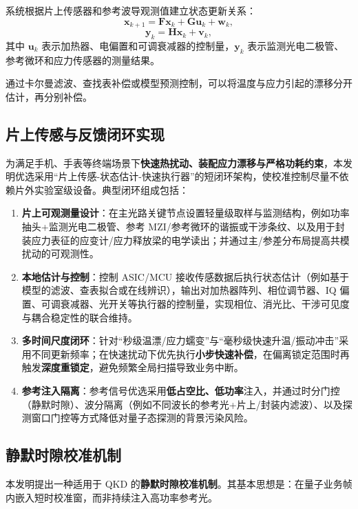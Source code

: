 \documentclass[12pt,a4paper]{article}
\begin{document}
系统根据片上传感器和参考波导观测值建立状态更新关系：
\[
\mathbf{x}_{k+1} = \mathbf{F}\mathbf{x}_k + \mathbf{G}\mathbf{u}_k + \mathbf{w}_k,
\]
\[
\mathbf{y}_k = \mathbf{H}\mathbf{x}_k + \mathbf{v}_k,
\]
其中 $\mathbf{u}_k$ 表示加热器、电偏置和可调衰减器的控制量，$\mathbf{y}_k$ 表示监测光电二极管、参考微环和应力传感器的测量结果。

通过卡尔曼滤波、查找表补偿或模型预测控制，可以将温度与应力引起的漂移分开估计，再分别补偿。

\subsection{片上传感与反馈闭环实现}

为满足手机、手表等终端场景下\textbf{快速热扰动、装配应力漂移与严格功耗约束}，本发明优选采用“片上传感-状态估计-快速执行器”的短闭环架构，使校准控制尽量不依赖片外实验室级设备。典型闭环组成包括：
\begin{enumerate}[label=(\arabic*)]
    \item \textbf{片上可观测量设计}：在主光路关键节点设置轻量级取样与监测结构，例如功率抽头+监测光电二极管、参考 MZI/参考微环的谐振或干涉条纹、以及用于封装应力表征的应变计/应力释放梁的电学读出；并通过主/参差分布局提高共模扰动的可观测性。
    \item \textbf{本地估计与控制}：控制 ASIC/MCU 接收传感数据后执行状态估计（例如基于模型的滤波、查表拟合或在线辨识），输出对加热器阵列、相位调节器、IQ 偏置、可调衰减器、光开关等执行器的控制量，实现相位、消光比、干涉可见度与耦合稳定性的联合维持。
    \item \textbf{多时间尺度闭环}：针对“秒级温漂/应力蠕变”与“毫秒级快速升温/振动冲击”采用不同更新频率；在快速扰动下优先执行\textbf{小步快速补偿}，在偏离锁定范围时再触发\textbf{深度重锁定}，避免频繁全局扫描导致业务中断。
    \item \textbf{参考注入隔离}：参考信号优选采用\textbf{低占空比、低功率}注入，并通过时分门控（静默时隙）、波分隔离（例如不同波长的参考光+片上/封装内滤波）、以及探测窗口门控等方式降低对量子态探测的背景污染风险。
\end{enumerate}

\subsection{静默时隙校准机制}

本发明提出一种适用于 QKD 的\textbf{静默时隙校准机制}。其基本思想是：在量子业务帧内嵌入短时校准窗，而非持续注入高功率参考光。
\end{document}
